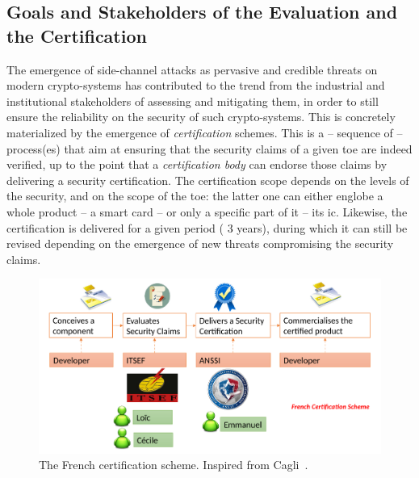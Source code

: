 \subsection{Goals and Stakeholders of the Evaluation and the Certification}

The emergence of side-channel attacks as pervasive and credible threats on modern crypto-systems has contributed to the trend from the industrial and institutional stakeholders of assessing and mitigating them, in order to still ensure the reliability on the security of such crypto-systems.
This is concretely materialized by the emergence of \emph{certification} schemes.
This is a -- sequence of -- process(es) that aim at ensuring that the security claims of a given \gls{toe} are indeed verified, up to the point that a \emph{certification body} can endorse those claims by delivering a security certification.
The certification scope depends on the levels of the security, and on the scope of the \gls{toe}: the latter one can either englobe a whole product -- \eg{} a smart card -- or only a specific part of it -- \eg{} its \gls{ic}.
Likewise, the certification is delivered for a given period (\eg{} 3 years), during which it can still be revised depending on the emergence of new threats compromising the security claims.

\begin{figure}
	\centering
	\includegraphics[width=\textwidth]{Figures/ITSEF_ANSSI_loic}
	\caption{The French certification scheme.
	Inspired from Cagli~\cite{cagli_these_2018}.}
	\label{fig:french_scheme}
\end{figure}

